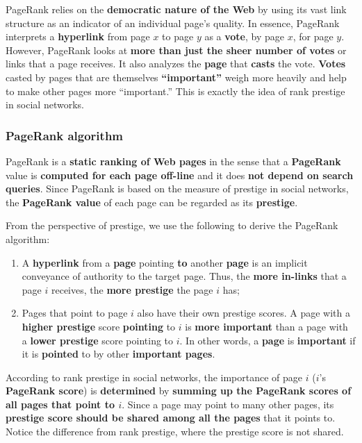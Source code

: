 PageRank relies on the \textbf{democratic nature of the Web} by using its vast link structure as an indicator of an individual page's quality. In essence, PageRank interprets a \textbf{hyperlink} from page $x$ to page $y$ as a \textbf{vote}, by page $x$, for page $y$. However, PageRank looks at \textbf{more than just the sheer number of votes} or links that a page receives. It also analyzes the \textbf{page} that \textbf{casts} the vote. \textbf{Votes} casted by pages that are themselves\textbf{ “important”} weigh more heavily and help to make other pages more “important.” This is exactly the idea of rank prestige in social networks.

\subsubsection{PageRank algorithm}
PageRank is a \textbf{static ranking of Web pages} in the sense that a \textbf{PageRank} value is \textbf{computed for each page off-line} and it does \textbf{not depend on search queries}. Since PageRank is based on the measure of prestige in social networks, the \textbf{PageRank value} of each page can be regarded as its \textbf{prestige}.

From the perspective of prestige, we use the following to derive the PageRank algorithm:

\begin{enumerate}
    \item A \textbf{hyperlink} from a \textbf{page} pointing \textbf{to} another \textbf{page} is an implicit conveyance of authority to the target page. Thus, the \textbf{more in-links} that a page $i$ receives, the \textbf{more prestige} the page $i$ has;
    \item Pages that point to page $i$ also have their own prestige scores. A page with a \textbf{higher prestige} score \textbf{pointing} to $i$ is \textbf{more important} than a page with a \textbf{lower prestige} score pointing to $i$. In other words, a \textbf{page} is \textbf{important} if it is \textbf{pointed} to by other \textbf{important pages}.
\end{enumerate}

According to rank prestige in social networks, the importance of page $i$ ($i$’s \textbf{PageRank score}) is \textbf{determined} by \textbf{summing up the PageRank scores of all pages that point to $i$}. Since a page may point to many other pages, its \textbf{prestige score should be shared among all the pages} that it points to. Notice the difference from rank prestige, where the prestige score is not shared.

